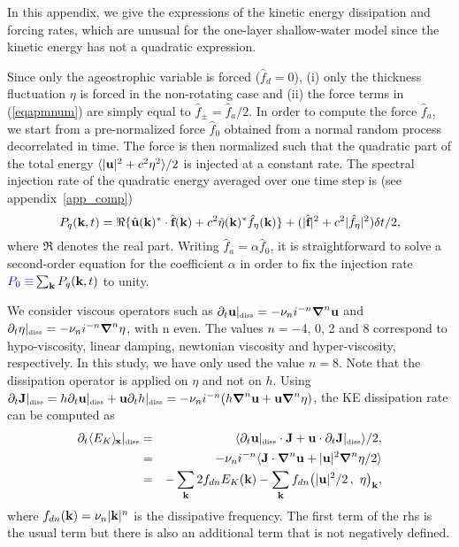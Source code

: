 In this appendix, we give the expressions of the kinetic energy
dissipation and forcing rates, which are unusual for the one-layer
shallow-water model since the kinetic energy has not a quadratic
expression.

Since only the ageostrophic variable is forced ($\hat f_d = 0$),%
(i) only the thickness fluctuation $\eta$ is forced in the
non-rotating case and %
(ii) the force terms in (\ref{eqapmnum}) are simply equal to $\hat
f_\pm = \hat f_a/2$.
%
In order to compute the force $\hat f_a$, we start from a
pre-normalized force $\hat f_{0}$ obtained from a normal random
process decorrelated in time.
%
The force is then normalized such that the quadratic part of the total
energy $\langle|\textbf{u}|^2 + c^2 \eta^2\rangle/2$ is injected at a
constant rate.
%
The spectral injection rate of the quadratic energy averaged over one
time step is (see appendix~\ref{app_comp})
\begin{equation}
P_q(\textbf{k}, t) 
= 
\Re\{ \hat {\textbf{u}}(\textbf{k})^* \cdot \hat {\textbf{f}}(\textbf{k}) 
+
c^2 \hat \eta(\textbf{k})^* \hat f_\eta(\textbf{k}) \}
+ 
(|\hat{\textbf{f}}|^2 + c^2 |\hat f_\eta|^2) \delta t /2,
\end{equation}
where $\Re$ denotes the real part.
%
Writing $\hat f_a = \alpha \hat f_{0}$, it is straightforward to solve
a second-order equation for the coefficient $\alpha$ in order to fix
the injection rate ${\color{blue}P_0 \equiv} \sum_{\textbf{k}} P_q(\textbf{k}, t)$ to unity.



We consider viscous operators such as $\p_t \uu |_{\mbox{\tiny diss}}
=- \nu_n i^{-n} \bnabla^n \uu $ and $\p_t \eta |_{\mbox{\tiny diss}}
=- \nu_n i^{-n} \bnabla^n \eta $, with n even.  The values $n=-4$, 0,
2 and 8 correspond to hypo-viscosity, linear damping, newtonian
viscosity and hyper-viscosity, respectively.  In this study, we have
only used the value $n=8$.
%
Note that the dissipation operator is applied on $\eta$ and not on
$h$.  Using $\p_t \JJ |_{\mbox{\tiny diss}} = h \p_t \uu
|_{\mbox{\tiny diss}} + \uu \p_t h |_{\mbox{\tiny diss}} = - \nu_n
i^{-n} (h \bnabla^n \uu + \uu \bnabla^n \eta )$, the KE dissipation
rate can be computed as
\begin{eqnarray}
\p_t \meanx{E_K} |_{\mbox{\tiny diss}} 
&=& 
\mean{
\p_t \uu |_{\mbox{\tiny diss}} \cdot \JJ
+ \uu \cdot \p_t \JJ |_{\mbox{\tiny diss}}
} /2, \\
&=& 
- \nu_n i^{-n}
\mean{
\JJ \cdot \bnabla^n \uu + |\uu|^2 \bnabla^n \eta /2
} \\
&=& 
- \sum_\kk 2 f_{dn}  E_K(\kk)
- \sum_\kk  f_{dn} \scalarprod{|\uu|^2/2}{\eta},
\end{eqnarray}
where $ f_{dn} (\textbf{k}) = \nu_n |\textbf{k}|^n$ is the dissipative frequency.
The first term of the rhs is the usual term but there is also an
additional term that is not negatively defined.




